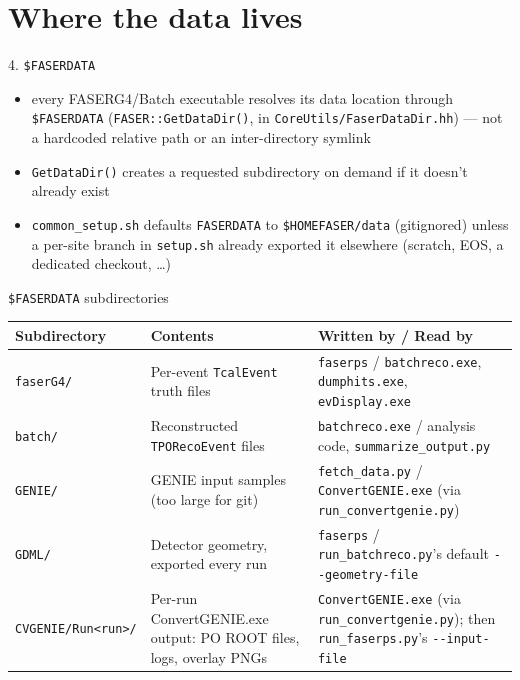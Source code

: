 \documentclass[aspectratio=169]{beamer}
\begin{document}
\section{Where the data lives}

\begin{frame}{4. \texttt{\$FASERDATA}}
  \begin{itemize}
    \item every FASERG4/Batch executable resolves its data location through
      \texttt{\$FASERDATA} (\texttt{FASER::GetDataDir()}, in
      \texttt{CoreUtils/FaserDataDir.hh}) --- not a hardcoded relative path
      or an inter-directory symlink
    \item \texttt{GetDataDir()} creates a requested subdirectory on demand
      if it doesn't already exist
    \item \texttt{common\_setup.sh} defaults \texttt{FASERDATA} to
      \texttt{\$HOMEFASER/data} (gitignored) unless a per-site branch in
      \texttt{setup.sh} already exported it elsewhere (scratch, EOS, a
      dedicated checkout, \ldots)
  \end{itemize}
\end{frame}

\begin{frame}{\texttt{\$FASERDATA} subdirectories}
  \centering
  \scriptsize
  \begin{tabular}{@{}p{2.3cm}p{4.9cm}p{4.0cm}@{}}
    \toprule
    \textbf{Subdirectory} & \textbf{Contents} & \textbf{Written by / Read by} \\
    \midrule
    \texttt{faserG4/} & Per-event \texttt{TcalEvent} truth files &
      \texttt{faserps} / \texttt{batchreco.exe}, \texttt{dumphits.exe},
      \texttt{evDisplay.exe} \\
    \texttt{batch/} & Reconstructed \texttt{TPORecoEvent} files &
      \texttt{batchreco.exe} / analysis code, \texttt{summarize\_output.py} \\
    \texttt{GENIE/} & GENIE input samples (too large for git) &
      \texttt{fetch\_data.py} / \texttt{ConvertGENIE.exe} (via
      \texttt{run\_convertgenie.py}) \\
    \texttt{GDML/} & Detector geometry, exported every run &
      \texttt{faserps} / \texttt{run\_batchreco.py}'s default
      \texttt{-{}-geometry-file} \\
    \texttt{CVGENIE/\allowbreak Run<run>/} & Per-run ConvertGENIE.exe
      output: PO ROOT files, logs, overlay PNGs &
      \texttt{ConvertGENIE.exe} (via \texttt{run\_convertgenie.py});
      then \texttt{run\_faserps.py}'s \texttt{-{}-input-file} \\
    \bottomrule
  \end{tabular}
\end{frame}
\end{document}
